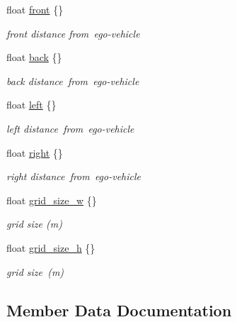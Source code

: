 \begin{DoxyCompactItemize}
float \hyperlink{structmaf__perception__interface_1_1LidarBEVGridMapResult_aa2066f095a913f8b8e31244321f99b63}{front} \{\}
\begin{DoxyCompactList}\small\item\em front distance from ego-\/vehicle \end{DoxyCompactList}\item 
float \hyperlink{structmaf__perception__interface_1_1LidarBEVGridMapResult_a7a9a5a184928479f6da8e8b6fad8881b}{back} \{\}
\begin{DoxyCompactList}\small\item\em back distance from ego-\/vehicle \end{DoxyCompactList}\item 
float \hyperlink{structmaf__perception__interface_1_1LidarBEVGridMapResult_ab32e1a854087694d6af92bd5eef499e8}{left} \{\}
\begin{DoxyCompactList}\small\item\em left distance from ego-\/vehicle \end{DoxyCompactList}\item 
float \hyperlink{structmaf__perception__interface_1_1LidarBEVGridMapResult_a421a0f479d444277338bfc300cc7e0fa}{right} \{\}
\begin{DoxyCompactList}\small\item\em right distance from ego-\/vehicle \end{DoxyCompactList}\item 
float \hyperlink{structmaf__perception__interface_1_1LidarBEVGridMapResult_a0a516ad7a2661309b68c7d316e23714c}{grid\+\_\+size\+\_\+w} \{\}
\begin{DoxyCompactList}\small\item\em grid size (m) \end{DoxyCompactList}\item 
float \hyperlink{structmaf__perception__interface_1_1LidarBEVGridMapResult_ad669b4f62c5664ce3960fce6a7b59521}{grid\+\_\+size\+\_\+h} \{\}
\begin{DoxyCompactList}\small\item\em grid size (m) \end{DoxyCompactList}\end{DoxyCompactItemize}


\subsection{Member Data Documentation}
\mbox{\label{structmaf__perception__interface_1_1LidarBEVGridMapResult_a9c7e982dcb19b2e6b978e7407b7c3bbf}} 
